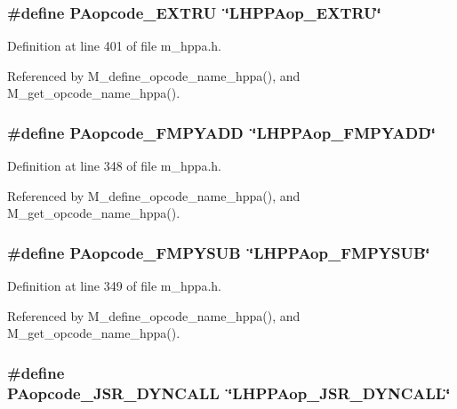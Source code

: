 \subsubsection{\setlength{\rightskip}{0pt plus 5cm}\#define PAopcode\_\-EXTRU~\char`\"{}LHPPAop\_\-EXTRU\char`\"{}}\label{m__hppa_8h_d3143b28e80872bd25a35f94c4fd3d67}




Definition at line 401 of file m\_\-hppa.h.

Referenced by M\_\-define\_\-opcode\_\-name\_\-hppa(), and M\_\-get\_\-opcode\_\-name\_\-hppa().
\subsubsection{\setlength{\rightskip}{0pt plus 5cm}\#define PAopcode\_\-FMPYADD~\char`\"{}LHPPAop\_\-FMPYADD\char`\"{}}\label{m__hppa_8h_cf3f350f13e1cf5255e8b0730bd1d270}




Definition at line 348 of file m\_\-hppa.h.

Referenced by M\_\-define\_\-opcode\_\-name\_\-hppa(), and M\_\-get\_\-opcode\_\-name\_\-hppa().
\subsubsection{\setlength{\rightskip}{0pt plus 5cm}\#define PAopcode\_\-FMPYSUB~\char`\"{}LHPPAop\_\-FMPYSUB\char`\"{}}\label{m__hppa_8h_366997ea14766eff37d5203de61be81c}




Definition at line 349 of file m\_\-hppa.h.

Referenced by M\_\-define\_\-opcode\_\-name\_\-hppa(), and M\_\-get\_\-opcode\_\-name\_\-hppa().
\subsubsection{\setlength{\rightskip}{0pt plus 5cm}\#define PAopcode\_\-JSR\_\-DYNCALL~\char`\"{}LHPPAop\_\-JSR\_\-DYNCALL\char`\"{}}\label{m__hppa_8h_6fcbbc6e0ce200b83f4b31b53e23a680}





